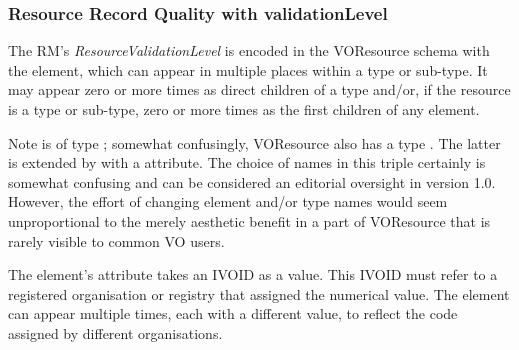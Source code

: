 \documentclass[11pt,a4paper]{ivoa}
\begin{document}


\subsubsection{Resource Record Quality with validationLevel}



The RM's \emph{ResourceValidationLevel} is encoded in the VOResource
schema with the  element, which can appear in
multiple places within a  type or sub-type.  It may
appear zero or more times as direct children of a 
type and/or, if the resource is a  type or sub-type,
zero or more times as the first children of any 
element.

\begin{admonition}{Note}
 is of type ; somewhat
confusingly, VOResource also has a type .  The
latter is extended by  with a 
attribute.  The choice of names in this triple certainly is somewhat
confusing and can be considered an editorial oversight in version 1.0.
However, the effort of changing element and/or type names would seem
unproportional to the merely aesthetic benefit in a part of VOResource
that is rarely visible to common VO users.
\end{admonition}

The  element's attribute
 takes an IVOID as a value.  This IVOID
must refer to a registered organisation or registry that assigned the
numerical value.  The  element can appear
multiple times, each with
a different  value, to reflect the code
assigned by different organisations.
\end{document}
